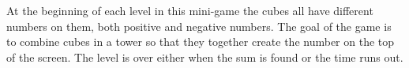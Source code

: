 
At the beginning of each level in this mini-game the cubes all have different numbers on them, both positive and negative numbers. The goal of the game is to combine cubes in a tower so that they together create the number on the top of the screen.
The level is over either when the sum is found or the time runs out.


